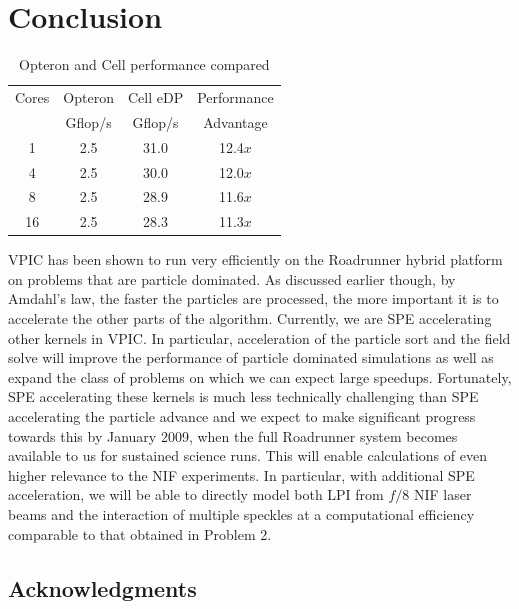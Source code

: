 \documentclass[journal,twoside]{IEEEtran}
\begin{document}
\section{Conclusion}

\begin{table}
\caption{Opteron and Cell performance compared}
\begin{center}
\begin{tabular}{c c c c}
\hline
\hline
Cores & Opteron & Cell eDP & Performance \\
      & Gflop/s &  Gflop/s &  Advantage  \\
\hline
    1 &     2.5 &     31.0 &     12.4$x$ \\
    4 &     2.5 &     30.0 &     12.0$x$ \\
    8 &     2.5 &     28.9 &     11.6$x$ \\
   16 &     2.5 &     28.3 &     11.3$x$ \\
\hline
\end{tabular}
\end{center}
\label{tbl:opteron-cell-compared}
\end{table}

VPIC has been shown to run very efficiently on the Roadrunner hybrid
platform on problems that are particle dominated.  As discussed
earlier though, by Amdahl's law, the faster the particles are
processed, the more important it is to accelerate the other parts of
the algorithm.  Currently, we are SPE accelerating other kernels in
VPIC.  In particular, acceleration of the particle sort and the field
solve will improve the performance of particle dominated simulations
as well as expand the class of problems on which we can expect large
speedups.  Fortunately, SPE accelerating these kernels is much less
technically challenging than SPE accelerating the particle advance and
we expect to make significant progress towards this by January 2009,
when the full Roadrunner system becomes available to us for sustained
science runs.  This will enable calculations of even higher relevance
to the NIF experiments.  In particular, with additional SPE
acceleration, we will be able to directly model both LPI from $f/8$
NIF laser beams and the interaction of multiple speckles at a
computational efficiency comparable to that obtained in Problem 2.

\subsection*{Acknowledgments}
\end{document}
